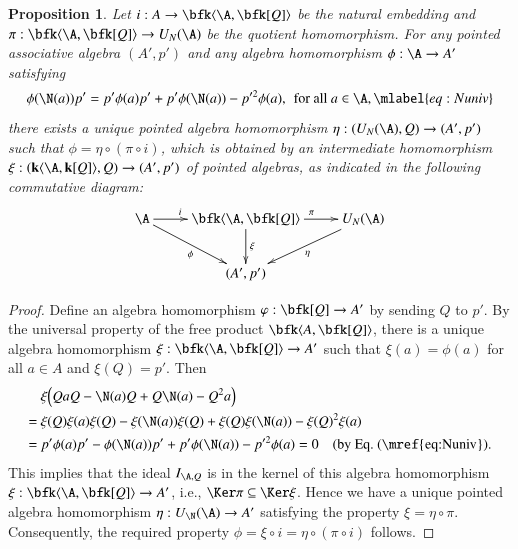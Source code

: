 \documentclass[12pt]{amsart}
\newtheorem{prop}[theorem]{Proposition}
\theoremstyle{definition}
\begin{document}
\begin{prop}  Let $i:A\to \bfk\langle \A,\bfk[Q]\rangle$ be the natural embedding and $\pi:\bfk\langle \A,\bfk[Q]\rangle  \to U_{N}(\A)$ be the quotient homomorphism. For any pointed associative algebra $(A', p')$  and any algebra homomorphism $\phi: \A \rightarrow A'$ satisfying
\begin{equation}
\phi( \N(a))p'=p' \phi(a)p'+p' \phi( \N(a))-p'^2\phi(a), \, \text{ for all } a\in \A,
\mlabel{eq:Nuniv}
\end{equation}
there exists a unique pointed algebra homomorphism $\eta: (U_{N}(\A), Q) \rightarrow (A', p')$ such that $\phi = \eta \circ (\pi \circ i)$, which is obtained by an intermediate homomorphism $\xi: (\mathbf{k}\langle \A,\mathbf{k}[Q]\rangle, Q) \rightarrow (A', p')$ of  pointed algebras, as indicated in the following commutative diagram: 
\[\xymatrix{
\A \ar[r]^{i\quad \quad}\ar[dr]_{\phi} &\bfk\langle \A,\bfk[Q]\rangle\ar[r]^{\quad \pi}\ar[d]^{\xi}&U_N(\A)\ar[dl]^{\eta}\\
&(A',p')& 
}\]
\end{prop}

\begin{proof} 
Define an algebra homomorphism $\varphi: \bfk[Q] \rightarrow A'$ by sending $Q$ to $p'$. By the universal property of the free product $\bfk \langle A, \bfk[Q] \rangle$, there is a unique algebra homomorphism  $\xi:\bfk \langle \A, \bfk[Q]\rangle\rightarrow A'$ such that $\xi(a)=\phi(a)$ for all $a \in A$ and $\xi(Q)=p'$. Then
\begin{align*}
&\ \xi\Big(QaQ-\N(a)Q+Q\N(a)-Q^2 a\Big)\\
=&\ \xi(Q) \xi(a) \xi(Q)-\xi(\N(a)) \xi(Q)+\xi(Q) \xi(\N(a))-\xi(Q)^2 \xi(a) \\
=&\ p' \phi(a) p'-\phi(\N(a))p'+p'\phi(\N(a))-p'^2\phi(a)=0 \quad (\text{by Eq.~(\mref{eq:Nuniv}}). 
\end{align*}
This implies that the ideal $I_{\A, Q}$ is in the kernel of this algebra homomorphism $\xi:\bfk \langle \A, \bfk[Q]\rangle\rightarrow A'$, i.e., $\Ker \pi \subseteq \Ker \xi$. Hence we have a unique pointed algebra homomorphism $\eta:U_\N(\A) \to A'$ satisfying the property $\xi=\eta\circ \pi$. Consequently, the required property $\phi=\xi\circ i=\eta\circ(\pi \circ i)$ follows.
\end{proof}
\end{document}
